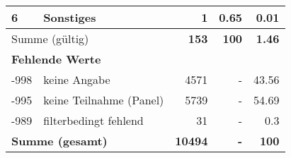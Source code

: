 \begin{longtable}{lXrrr}
     6 &
     \multicolumn{1}{X}{ Sonstiges   } &


       \num{1} &
       \num[round-mode=places,round-precision=2]{0,65} &
         \num[round-mode=places,round-precision=2]{0,01} \\
     \midrule
     \multicolumn{2}{l}{Summe (gültig)} &
       \textbf{\num{153}} &
     \textbf{100} &
       \textbf{\num[round-mode=places,round-precision=2]{1,46}} \\
     \multicolumn{5}{l}{\textbf{Fehlende Werte}}\\
       -998 &
       keine Angabe &
         \num{4571} &
        - &
         \num[round-mode=places,round-precision=2]{43,56} \\
       -995 &
       keine Teilnahme (Panel) &
         \num{5739} &
        - &
         \num[round-mode=places,round-precision=2]{54,69} \\
       -989 &
       filterbedingt fehlend &
         \num{31} &
        - &
         \num[round-mode=places,round-precision=2]{0,3} \\
     \midrule
     \multicolumn{2}{l}{\textbf{Summe (gesamt)}} &
          \textbf{\num{10494}} &
        \textbf{-} &
        \textbf{100} \\
     \bottomrule
     \end{longtable}
     
